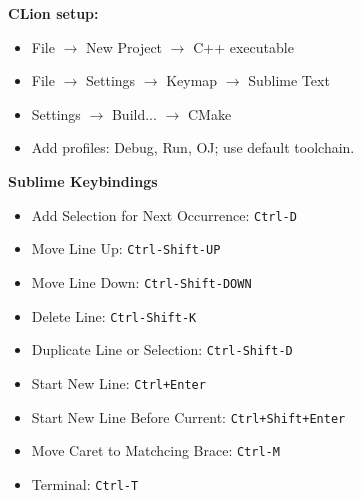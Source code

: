 \textbf{CLion setup:}
\begin{itemize}
  \item File $\rightarrow$ New Project $\rightarrow$ C++ executable
  \item File $\rightarrow$ Settings $\rightarrow$ Keymap $\rightarrow$ Sublime Text
  \item Settings $\rightarrow$ Build... $\rightarrow$ CMake
  \item Add profiles: Debug, Run, OJ; use default toolchain.
\end{itemize}

\textbf{Sublime Keybindings}
\begin{itemize}
  \item Add Selection for Next Occurrence: \texttt{Ctrl-D}
  \item Move Line Up: \texttt{Ctrl-Shift-UP}
  \item Move Line Down: \texttt{Ctrl-Shift-DOWN}
  \item Delete Line: \texttt{Ctrl-Shift-K}
  \item Duplicate Line or Selection: \texttt{Ctrl-Shift-D}
  \item Start New Line: \texttt{Ctrl+Enter}
  \item Start New Line Before Current: \texttt{Ctrl+Shift+Enter}
  \item Move Caret to Matchcing Brace: \texttt{Ctrl-M}
  \item Terminal: \texttt{Ctrl-T}
\end{itemize}
